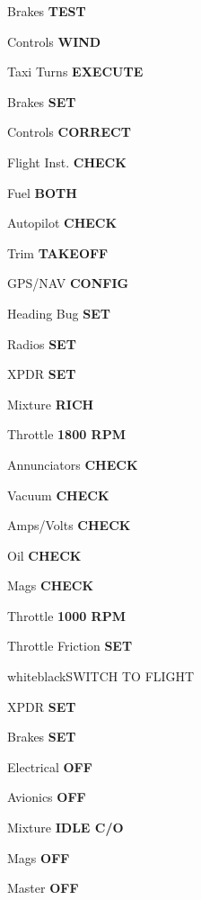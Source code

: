 \documentclass{article}
\begin{document}
\begin{multicols*}{3}
Brakes \dotfill \textbf{TEST}

Controls \dotfill \textbf{WIND}

Taxi Turns \dotfill \textbf{EXECUTE}

\colorbox{green!80!red}{}

Brakes \dotfill \textbf{SET}

Controls \dotfill \textbf{CORRECT}

Flight Inst. \dotfill \textbf{CHECK}

Fuel \dotfill \textbf{BOTH}

Autopilot \dotfill \textbf{CHECK}

Trim \dotfill \textbf{TAKEOFF}

GPS/NAV \dotfill \textbf{CONFIG}

Heading Bug \dotfill \textbf{SET}

Radios \dotfill \textbf{SET}

XPDR \dotfill \textbf{SET}

Mixture \dotfill \textbf{RICH}

Throttle \dotfill \textbf{1800 RPM}

Annunciators \dotfill \textbf{CHECK}

Vacuum \dotfill \textbf{CHECK}

Amps/Volts \dotfill \textbf{CHECK}

Oil \dotfill \textbf{CHECK}

Mags \dotfill \textbf{CHECK}

Throttle \dotfill \textbf{1000 RPM}

Throttle Friction \dotfill \textbf{SET} \\

\begin{groupheading}{white}{black}{SWITCH TO FLIGHT}
\end{groupheading}

\color{black}

\colorbox{green!80!red}{}

XPDR \dotfill \textbf{SET}

Brakes \dotfill \textbf{SET}

Electrical \dotfill \textbf{OFF}

Avionics \dotfill \textbf{OFF}

Mixture \dotfill \textbf{IDLE C/O}

Mags \dotfill \textbf{OFF}

Master \dotfill \textbf{OFF}


\end{multicols*}
\end{document}
